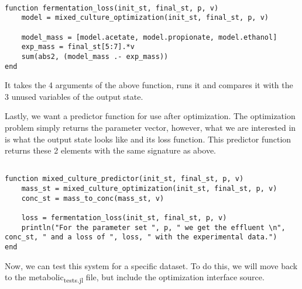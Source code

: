 \documentclass[11pt]{article}
\begin{document}
\begin{verbatim}

function fermentation_loss(init_st, final_st, p, v)
    model = mixed_culture_optimization(init_st, final_st, p, v)

    model_mass = [model.acetate, model.propionate, model.ethanol]
    exp_mass = final_st[5:7].*v
    sum(abs2, (model_mass .- exp_mass))
end

\end{verbatim}

It takes the 4 arguments of the above function, runs it and compares it with the 3 unused variables of the output state.

Lastly, we want a predictor function for use after optimization. The optimization problem simply returns the parameter vector, however, what we are interested in is what the output state looks like and its loss function. This predictor function returns these 2 elements with the same signature as above.

\begin{verbatim}

function mixed_culture_predictor(init_st, final_st, p, v)
    mass_st = mixed_culture_optimization(init_st, final_st, p, v)
    conc_st = mass_to_conc(mass_st, v)

    loss = fermentation_loss(init_st, final_st, p, v)
    println("For the parameter set ", p, " we get the effluent \n", conc_st, " and a loss of ", loss, " with the experimental data.")
end

\end{verbatim}

Now, we can test this system for a specific dataset. To do this, we will move back to the metabolic\textsubscript{tests.jl} file, but include the optimization interface source.
\end{document}
